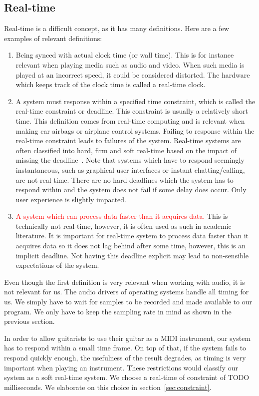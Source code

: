 \documentclass[10pt,twocolumn]{article}
\begin{document}
\subsection{Real-time}
Real-time is a difficult concept, as it has many definitions. Here are a few examples of relevant definitions:
\begin{enumerate}
    \item Being synced with actual clock time (or wall time). This is for instance relevant when playing media such as audio and video. When such media is played at an incorrect speed, it could be considered distorted. The hardware which keeps track of the clock time is called a real-time clock.
    \item A system must response within a specified time constraint, which is called the real-time constraint or deadline. This constraint is usually a relatively short time. This definition comes from real-time computing and is relevant when making car airbags or airplane control systems. Failing to response within the real-time constraint leads to failures of the system. Real-time systems are often classified into hard, firm and soft real-time based on the impact of missing the deadline~\cite{realclass}. Note that systems which have to respond seemingly instantaneous, such as graphical user interfaces or instant chatting/calling, are not real-time. There are no hard deadlines which the system has to respond within and the system does not fail if some delay does occur. Only user experience is slightly impacted.
    \item \textcolor{red}{A system which can process data faster than it acquires data.} This is technically not real-time, however, it is often used as such in academic literature. It is important for real-time system to process data faster than it acquires data so it does not lag behind after some time, however, this is an implicit deadline. Not having this deadline explicit may lead to non-sensible expectations of the system.
\end{enumerate}
Even though the first definition is very relevant when working with audio, it is not relevant for us. The audio drivers of operating systems handle all timing for us. We simply have to wait for samples to be recorded and made available to our program. We only have to keep the sampling rate in mind as shown in the previous section.

In order to allow guitarists to use their guitar as a MIDI instrument, our system has to respond within a small time frame. On top of that, if the system fails to respond quickly enough, the usefulness of the result degrades, as timing is very important when playing an instrument. These restrictions would classify our system as a soft real-time system. We choose a real-time of constraint of TODO milliseconds. We elaborate on this choice in section~\ref{sec:constraint}.
\end{document}
